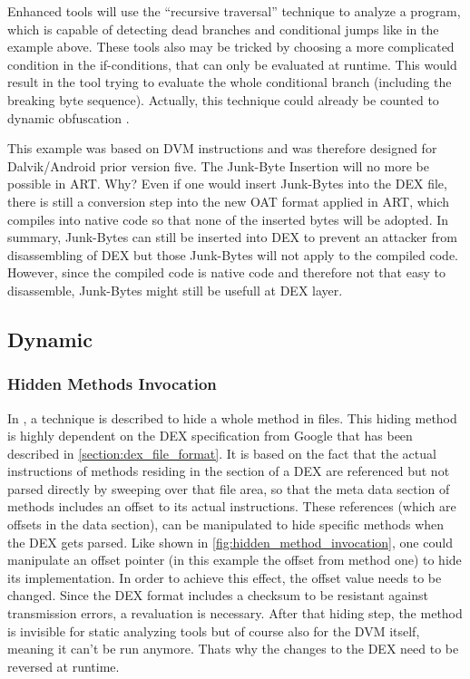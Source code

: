 Enhanced tools will use the ``recursive traversal'' technique to analyze a
program, which is capable of detecting dead branches and conditional jumps like in the example above.
These tools also may be tricked by choosing a more complicated condition in the
if-conditions, that can only be evaluated at runtime. This would result in the tool trying to evaluate the whole conditional branch (including the breaking byte sequence). Actually, this technique could already be counted to dynamic obfuscation \parencite[p.68]{lvl_imp}.


This example was based on DVM instructions and was therefore designed for Dalvik/Android prior version five.
The Junk-Byte Insertion will no more be possible in ART. Why?
Even if one would insert Junk-Bytes into the DEX file, there is still a conversion
step into the new OAT format applied in ART, which compiles into native code so
that none of the inserted bytes will be adopted. In summary, Junk-Bytes can still be inserted into DEX to prevent an attacker from disassembling of DEX but those Junk-Bytes will not apply to the compiled code. However, since the compiled code
is native code and therefore not that easy to disassemble, Junk-Bytes might still be
usefull at DEX layer.

\subsection{Dynamic}
\subsubsection{Hidden Methods Invocation}
In \parencite[p.82f]{lvl_imp}, a technique is described to hide a whole method
in  files. This hiding method is highly dependent on the DEX specification from Google \parencite{dex} that has been described in
\autoref{section:dex_file_format}.
It is based on the fact that the actual instructions of methods residing
in the  section of a DEX are referenced but not parsed directly
by sweeping over that file area, so that the meta data section of methods
includes an offset to its actual instructions.
These references (which are offsets in the data section), can be manipulated
to hide specific methods when the DEX gets parsed. Like shown in
 \autoref{fig:hidden_method_invocation}, one could manipulate
 an offset pointer (in this example the offset from method one)
to hide its implementation.
In order to achieve this effect, the offset value needs to be changed.
Since the DEX format includes a checksum to be resistant
against transmission errors, a revaluation is necessary.
After that hiding step, the method is invisible for static analyzing tools
but of course also for the DVM itself, meaning it can't be run anymore.
Thats why the changes to the DEX need to be reversed at runtime.

